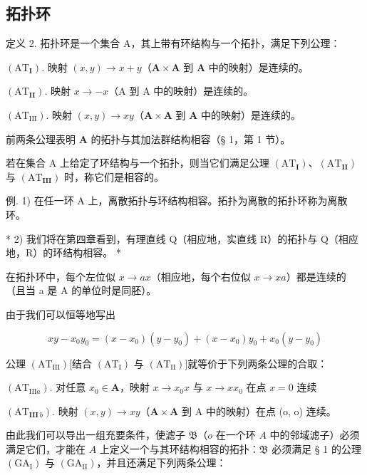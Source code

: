 \subsection{拓扑环}

定义 2. 拓扑环是一个集合 A，其上带有环结构与一个拓扑，满足下列公理：

\((\mathrm{AT}_{\mathbf{I}})\). 映射 \((x,y) \to x + y\)（\(\mathbf{A} \times \mathbf{A}\) 到 \(\mathbf{A}\) 中的映射）是连续的。

\((\mathrm{AT}_{\mathbf{II}})\). 映射 \(x \to -x\)（A 到 A 中的映射）是连续的。

\((\mathrm{AT}_{\mathrm{III}})\). 映射 \((x,y)\to xy\)（\(\mathbf{A}\times \mathbf{A}\) 到 \(\mathbf{A}\) 中的映射）是连续的。

前两条公理表明 \(\mathbf{A}\) 的拓扑与其加法群结构相容（§ 1，第 1 节）。

若在集合 A 上给定了环结构与一个拓扑，则当它们满足公理 \((\mathrm{AT}_{\mathbf{I}})\)、\((\mathrm{AT}_{\mathbf{II}})\) 与 \((\mathrm{AT}_{\mathbf{III}})\) 时，称它们是相容的。

例. 1) 在任一环 A 上，离散拓扑与环结构相容。拓扑为离散的拓扑环称为离散环。

* 2) 我们将在第四章看到，有理直线 Q（相应地，实直线 R）的拓扑与 Q（相应地，R）的环结构相容。 *

在拓扑环中，每个左位似 \(x \rightarrow ax\)（相应地，每个右位似 \(x \rightarrow xa\)）都是连续的（且当 a 是 A 的单位时是同胚）。

由于我们可以恒等地写出

\[
x y - x _ {0} y _ {0} = (x - x _ {0}) (y - y _ {0}) + (x - x _ {0}) y _ {0} + x _ {0} (y - y _ {0})
\]

公理 \((\mathrm{AT}_{\mathrm{III}})\){[}结合 \((\mathrm{AT}_{\mathrm{I}})\) 与 \((\mathrm{AT}_{\mathrm{II}})\){]}就等价于下列两条公理的合取：

\((\mathrm{AT}_{\mathrm{III}a})\). 对任意 \(x_0\in \mathbf{A}\)，映射 \(x\to x_0x\) 与 \(x\rightarrow xx_0\) 在点 \(x = 0\) 连续

\((\mathrm{AT}_{\mathbf{III}\ b})\). 映射 \((x,y)\rightarrow xy\)（\(\mathbf{A}\times \mathbf{A}\) 到 A 中的映射）在点 (o, o) 连续。

由此我们可以导出一组充要条件，使滤子 \(\mathfrak{B}\)（\(o\) 在一个环 \(A\) 中的邻域滤子）必须满足它们，才能在 \(A\) 上定义一个与其环结构相容的拓扑：\(\mathfrak{B}\) 必须满足 § 1 的公理 \((\mathrm{GA}_{\mathrm{I}})\) 与 \((\mathrm{GA}_{\mathrm{II}})\)，并且还满足下列两条公理：

